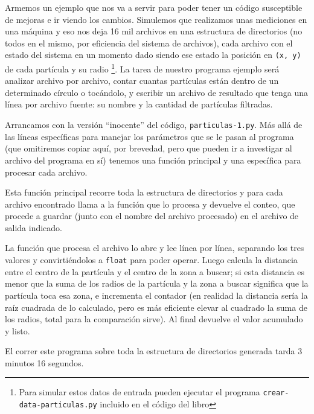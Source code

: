 Armemos un ejemplo que nos va a servir para poder tener un código susceptible de mejoras e ir viendo los cambios. Simulemos que realizamos unas mediciones en una máquina y eso nos deja 16 mil archivos en una estructura de directorios (no todos en el mismo, por eficiencia del sistema de archivos), cada archivo con el estado del sistema en un momento dado siendo ese estado la posición en \texttt{(x, y)} de cada partícula y su radio \footnote{Para simular estos datos de entrada pueden ejecutar el programa \texttt{crear-data-particulas.py} incluido en el código del libro}. La tarea de nuestro programa ejemplo será analizar archivo por archivo, contar cuantas partículas están dentro de un determinado círculo o tocándolo, y escribir un archivo de resultado que tenga una línea por archivo fuente: su nombre y la cantidad de partículas filtradas.

Arrancamos con la versión ``inocente'' del código, \texttt{particulas-1.py}. Más allá de las líneas específicas para manejar los parámetros que se le pasan al programa (que omitiremos copiar aquí, por brevedad, pero que pueden ir a investigar al archivo del programa en sí) tenemos una función principal y una específica para procesar cada archivo.


Esta función principal recorre toda la estructura de directorios y para cada archivo encontrado llama a la función que lo procesa y devuelve el conteo, que procede a guardar (junto con el nombre del archivo procesado) en el archivo de salida indicado.


La función que procesa el archivo lo abre y lee línea por línea, separando los tres valores y convirtiéndolos a \texttt{float} para poder operar. Luego calcula la distancia entre el centro de la partícula y el centro de la zona a buscar; si esta distancia es menor que la suma de los radios de la partícula y la zona a buscar significa que la partícula toca esa zona, e incrementa el contador (en realidad la distancia sería la raíz cuadrada de lo calculado, pero es más eficiente elevar al cuadrado la suma de los radios, total para la comparación sirve). Al final devuelve el valor acumulado y listo.

El correr este programa sobre toda la estructura de directorios generada tarda 3 minutos 16 segundos. 



